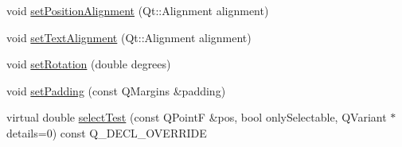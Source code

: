 \begin{DoxyCompactItemize}
\item 
void \hyperlink{classQCPItemText_a781cdf8c640fc6a055dcff1e675c8c7a}{set\+Position\+Alignment} (Qt\+::\+Alignment alignment)
\item 
void \hyperlink{classQCPItemText_ab5bc0684c4d1bed81949a11b34dba478}{set\+Text\+Alignment} (Qt\+::\+Alignment alignment)
\item 
void \hyperlink{classQCPItemText_a4bcc10cd97952c3f749d75824b5077f0}{set\+Rotation} (double degrees)
\item 
void \hyperlink{classQCPItemText_aeea8a3e01f135f9dd0bb08f51db66310}{set\+Padding} (const Q\+Margins \&padding)
\item 
virtual double \hyperlink{classQCPItemText_a676aaec10ad3cc4d7d0e4847db04c838}{select\+Test} (const Q\+PointF \&pos, bool only\+Selectable, Q\+Variant $\ast$details=0) const Q\+\_\+\+D\+E\+C\+L\+\_\+\+O\+V\+E\+R\+R\+I\+DE
\end{DoxyCompactItemize}
